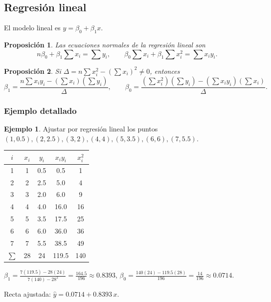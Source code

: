 \documentclass[a4paper,12pt]{article}
\theoremstyle{definition}
\newtheorem{ejemplo}{Ejemplo}[section]
\theoremstyle{plain}
\newtheorem{proposicion}{Proposición}[section]
\begin{document}
\subsection{Regresión lineal}

El modelo lineal es $y=\beta_0+\beta_1 x$.

\begin{proposicion}
Las ecuaciones normales de la regresión lineal son
\[
n\beta_0+\beta_1\sum x_i = \sum y_i,
\qquad
\beta_0\sum x_i + \beta_1\sum x_i^2 = \sum x_i y_i.
\]
\end{proposicion}

\begin{proposicion}
Si $\Delta = n\sum x_i^2-\left(\sum x_i\right)^2 \neq 0$, entonces
\[
\beta_1=\frac{n\sum x_i y_i-\left(\sum x_i\right)\left(\sum y_i\right)}
             {\Delta},
\qquad
\beta_0=\frac{\left(\sum x_i^2\right)\left(\sum y_i\right)
             -\left(\sum x_i y_i\right)\left(\sum x_i\right)}{\Delta}.
\]
\end{proposicion}

\subsubsection{Ejemplo detallado}

\begin{ejemplo}
Ajustar por regresión lineal los puntos
$(1,0.5),(2,2.5),(3,2),(4,4),(5,3.5),(6,6),(7,5.5)$.

\begin{center}
\begin{tabular}{ccccc}
\toprule
$i$ & $x_i$ & $y_i$ & $x_i y_i$ & $x_i^2$ \\
\midrule
1 & 1 & 0.5 & 0.5 & 1 \\
2 & 2 & 2.5 & 5.0 & 4 \\
3 & 3 & 2.0 & 6.0 & 9 \\
4 & 4 & 4.0 & 16.0 & 16 \\
5 & 5 & 3.5 & 17.5 & 25 \\
6 & 6 & 6.0 & 36.0 & 36 \\
7 & 7 & 5.5 & 38.5 & 49 \\
\midrule
$\sum$ & 28 & 24 & 119.5 & 140 \\
\bottomrule
\end{tabular}
\end{center}

$\beta_1 = \frac{7(119.5)-28(24)}{7(140)-28^2} = \frac{164.5}{196}
\approx 0.8393$,\quad
$\beta_0 = \frac{140(24)-119.5(28)}{196} = \frac{14}{196} \approx 0.0714$.

Recta ajustada: $\hat{y} = 0.0714 + 0.8393\,x$.
\end{ejemplo}
\end{document}
